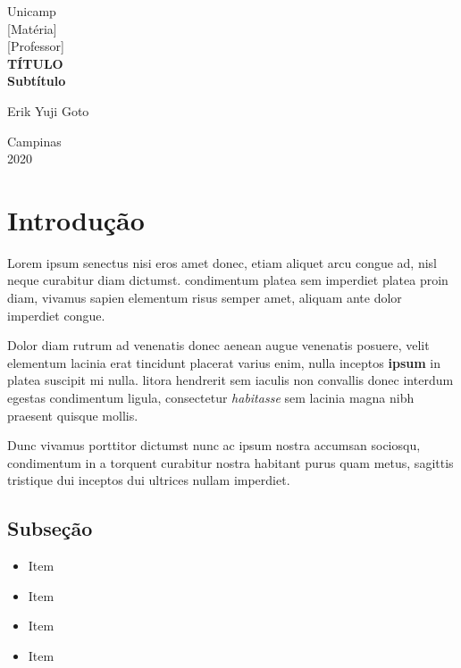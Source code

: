 \documentclass[a4paper, 12pt]{article}
\begin{document}
%
\begin{titlepage} %
	\begin{center} %
		{\large Unicamp}\\[0.2cm] %
		{\large [Matéria]}\\[0.2cm] %
		{\large [Professor]}\\[3.2cm]
		{\bf \huge TÍTULO}\\[0.2cm] 
		{\bf \large Subtítulo}\\[4.9cm]
	\end{center} %
	{\large Erik Yuji Goto}\\[10cm] %
	\begin{center}
		{\large Campinas}\\[0.2cm]
		{\large 2020}
	\end{center}
\end{titlepage} %


\tableofcontents
\newpage

\section{Introdução}
Lorem ipsum senectus nisi eros amet donec, etiam aliquet arcu congue ad, nisl neque curabitur diam dictumst. condimentum platea sem imperdiet platea proin diam, vivamus sapien elementum risus semper amet, aliquam ante dolor imperdiet congue. 

Dolor diam rutrum ad venenatis donec aenean augue venenatis posuere, velit elementum lacinia erat tincidunt placerat varius enim, nulla inceptos \textbf{ipsum} in platea suscipit mi nulla. litora hendrerit sem iaculis non convallis donec interdum egestas condimentum ligula, consectetur \textit{habitasse} sem lacinia magna nibh praesent quisque mollis. 

Dunc vivamus porttitor dictumst nunc ac ipsum nostra accumsan sociosqu, condimentum in a torquent curabitur nostra habitant purus quam metus, sagittis tristique dui inceptos dui ultrices nullam imperdiet. 


\subsection{Subseção}
	\begin{itemize}
		\item Item
		\item Item 
		\item Item
		\item Item		
	\end{itemize}
	
\end{document}
